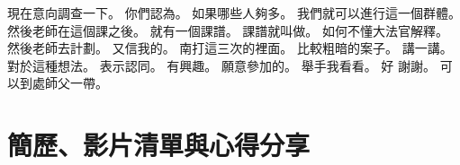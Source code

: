 \hypertarget{c01:cue:409}{}現在意向調查一下。
\hypertarget{c01:cue:410}{}你們認為。
\hypertarget{c01:cue:411}{}如果哪些人夠多。
\hypertarget{c01:cue:412}{}我們就可以進行這一個群體。
\hypertarget{c01:cue:413}{}然後老師在這個課之後。
\hypertarget{c01:cue:414}{}就有一個課譜。
\hypertarget{c01:cue:415}{}課譜就叫做。
\hypertarget{c01:cue:416}{}如何不懂大法官解釋。
\hypertarget{c01:cue:417}{}然後老師去計劃。
\hypertarget{c01:cue:418}{}又信我的。
\hypertarget{c01:cue:419}{}南打這三次的裡面。
\hypertarget{c01:cue:420}{}比較粗暗的案子。
\hypertarget{c01:cue:421}{}講一講。
\hypertarget{c01:cue:422}{}對於這種想法。
\hypertarget{c01:cue:423}{}表示認同。
\hypertarget{c01:cue:424}{}有興趣。
\hypertarget{c01:cue:425}{}願意參加的。
\hypertarget{c01:cue:426}{}舉手我看看。
\hypertarget{c01:cue:427}{}好 謝謝。
\hypertarget{c01:cue:428}{}可以到處師父一帶。

\section{簡歷、影片清單與心得分享}

